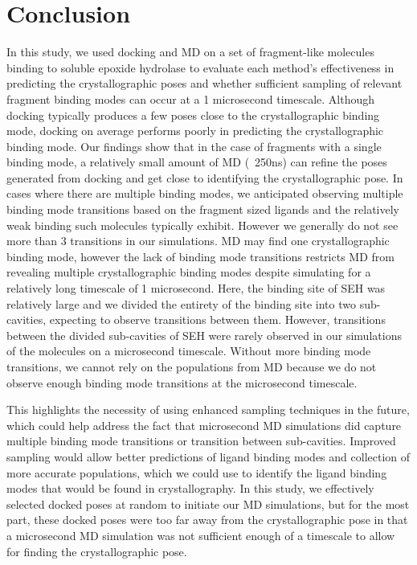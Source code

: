 \documentclass[journal=jcisd8,manuscript=article]{achemso}
\begin{document}
\section{Conclusion}
In this study, we used docking and MD on a set of fragment-like molecules binding to soluble epoxide hydrolase to evaluate each method's effectiveness in predicting the crystallographic poses and whether sufficient sampling of relevant fragment binding modes can occur at a 1 microsecond timescale.
Although docking typically produces a few poses close to the crystallographic binding mode, docking on average performs poorly in predicting the crystallographic binding mode.
Our findings show that in the case of fragments with a single binding mode, a relatively small amount of MD  (~250ns) can refine the poses generated from docking and get close to identifying the crystallographic pose. 
In cases where there are multiple binding modes, we anticipated observing multiple binding mode transitions based on the fragment sized ligands and the relatively weak binding such molecules typically exhibit. However we generally do not see more than 3 transitions in our simulations.
MD may find one crystallographic binding mode, however the lack of binding mode transitions restricts MD from revealing multiple crystallographic binding modes despite simulating for a relatively long timescale of 1 microsecond.
Here, the binding site of SEH was relatively large and we divided the entirety of the binding site into two sub-cavities, expecting to observe transitions between them.
However, transitions between the divided sub-cavities of SEH were rarely observed in our simulations of the molecules on a microsecond timescale.
Without more binding mode transitions, we cannot rely on the populations from MD because we do not observe enough binding mode transitions at the microsecond timescale. 

This highlights the necessity of using enhanced sampling techniques in the future, which could help address the fact that microsecond MD simulations did capture multiple binding mode transitions or transition between sub-cavities.
Improved sampling would allow better predictions of ligand binding modes and collection of more accurate populations, which we could use to identify the ligand binding modes that would be found in crystallography.
In this study, we effectively selected docked poses at random to initiate our MD simulations, but for the most part, these docked poses were too far away from the crystallographic pose in that a microsecond MD simulation was not sufficient enough of a timescale to allow for finding the crystallographic pose.
\end{document}
